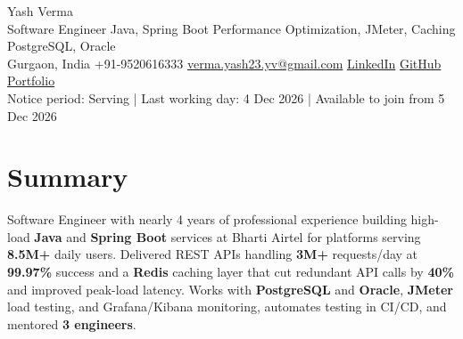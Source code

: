 \documentclass[letterpaper,10pt]{article}
\begin{document}
\begin{center}
  {\Huge Yash Verma} \\
  \small Software Engineer \textbar{} Java, Spring Boot \textbar{} Performance Optimization, JMeter, Caching \textbar{} PostgreSQL, Oracle \\
  \small Gurgaon, India \textbar{} +91-9520616333 \textbar{} \href{mailto:verma.yash23.yv@gmail.com}{verma.yash23.yv@gmail.com} \textbar{}
  \href{https://www.linkedin.com/in/yash-verma-9243a7193/}{LinkedIn} \textbar{}
  \href{https://github.com/yashverma230600}{GitHub} \textbar{}
  \href{https://yashverma230600.github.io/yash-portfolio/}{Portfolio} \\
  Notice period: Serving | Last working day: 4 Dec 2026 | Available to join from 5 Dec 2026
  \vspace{-8pt}
\end{center}

\section{Summary}
\begin{itemize}[leftmargin=0.15in, label={}]
  \small{\item{
    Software Engineer with nearly 4 years of professional experience building high-load \textbf{Java} and \textbf{Spring Boot} services at Bharti Airtel for platforms serving \textbf{8.5M+} daily users. Delivered REST APIs handling \textbf{3M+} requests/day at \textbf{99.97\%} success and a \textbf{Redis} caching layer that cut redundant API calls by \textbf{40\%} and improved peak-load latency. Works with \textbf{PostgreSQL} and \textbf{Oracle}, \textbf{JMeter} load testing, and Grafana/Kibana monitoring, automates testing in CI/CD, and mentored \textbf{3 engineers}.
  }}
\end{itemize}
\vspace{-8pt}

\end{document}
